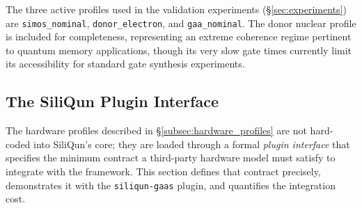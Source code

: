 \begin{table}[ht]
  \centering
  \caption{SiliQun hardware profile parameters drawn from peer-reviewed sources.
    $T_1$, $T_2$: relaxation and dephasing times.
    $\sigma_\varepsilon$: charge noise amplitude (\textmu eV).
    $\sigma_J$: exchange noise amplitude (MHz).
    $A_{\text{hf}}$: hyperfine coupling (donor profiles only, MHz).
    $p_2$: two-qubit gate error probability.
    $\tau_1$, $\tau_2$: single- and two-qubit gate durations (ns).
    Sources: SiMOS~\cite{Xue2022,Noiri2022,Philips2022};
    donor~\cite{Madzik2022,Morello2020}; GAA~\cite{Tanamoto2025}.}
  \label{tab:hardware_profiles}
\end{table}

The three active profiles used in the validation experiments
(\S\ref{sec:experiments}) are \texttt{simos\_nominal},
\texttt{donor\_electron}, and \texttt{gaa\_nominal}.
The donor nuclear profile is included for completeness, representing
an extreme coherence regime pertinent to quantum memory applications,
though its very slow gate times currently limit its accessibility for
standard gate synthesis experiments.

\subsection{The SiliQun Plugin Interface}
\label{subsec:plugin_interface}

The hardware profiles described in \S\ref{subsec:hardware_profiles} are
not hard-coded into SiliQun's core; they are loaded through a formal
\emph{plugin interface} that specifies the minimum contract a third-party
hardware model must satisfy to integrate with the framework.
This section defines that contract precisely, demonstrates it with the
\texttt{siliqun-gaas} plugin, and quantifies the integration cost.

